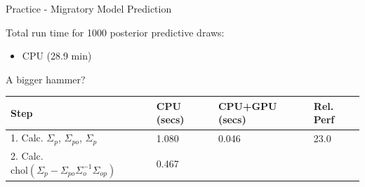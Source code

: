 \documentclass[11pt,ignorenonframetext,]{beamer}
\providecommand{\tightlist}{%
  \setlength{\itemsep}{0pt}\setlength{\parskip}{0pt}}
\begin{document}
\begin{frame}{Practice - Migratory Model Prediction}
\normalsize

Total run time for 1000 posterior predictive draws:

\begin{itemize}
\tightlist
\item
  CPU (28.9 min)
\end{itemize}

\end{frame}

\begin{frame}{A bigger hammer?}
\protect\hypertarget{a-bigger-hammer}{}

\scriptsize

\begin{longtable}[]{@{}llll@{}}
\toprule
\begin{minipage}[b]{0.41\columnwidth}\raggedright
Step\strut
\end{minipage} & \begin{minipage}[b]{0.15\columnwidth}\raggedright
CPU (secs)\strut
\end{minipage} & \begin{minipage}[b]{0.19\columnwidth}\raggedright
CPU+GPU (secs)\strut
\end{minipage} & \begin{minipage}[b]{0.13\columnwidth}\raggedright
Rel. Perf\strut
\end{minipage}\tabularnewline
\midrule
\endhead
\begin{minipage}[t]{0.41\columnwidth}\raggedright
1. Calc. \(\Sigma_p\), \(\Sigma_{po}\), \(\Sigma_{p}\)\strut
\end{minipage} & \begin{minipage}[t]{0.15\columnwidth}\raggedright
1.080\strut
\end{minipage} & \begin{minipage}[t]{0.19\columnwidth}\raggedright
0.046\strut
\end{minipage} & \begin{minipage}[t]{0.13\columnwidth}\raggedright
23.0\strut
\end{minipage}\tabularnewline
\begin{minipage}[t]{0.41\columnwidth}\raggedright
2. Calc.
\(\text{chol}(\Sigma_p - \Sigma_{po} \Sigma_{o}^{-1} \Sigma_{op})\)\strut
\end{minipage} & \begin{minipage}[t]{0.15\columnwidth}\raggedright
0.467\strut
\end{minipage} & \begin{minipage}[t]{0.19\columnwidth}\raggedright

\end{minipage}
\end{longtable}
\end{frame}
\end{document}
